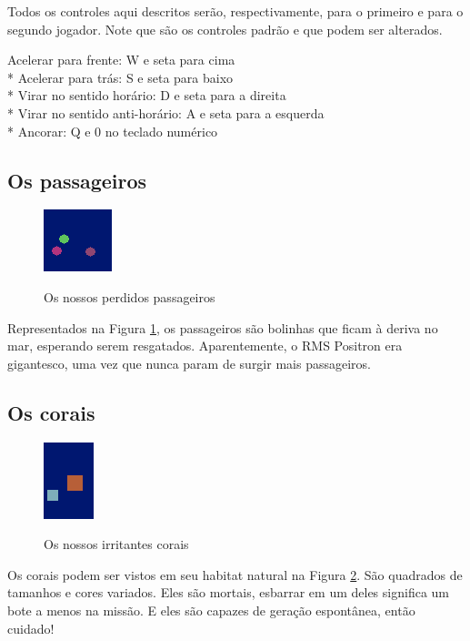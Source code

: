 \documentclass[10pt,brazil]{article}
\begin{document}
Todos os controles aqui descritos serão, respectivamente, para o primeiro e para o segundo jogador. Note que são os
controles padrão e que podem ser alterados.

Acelerar para frente: W e seta para cima\\*
Acelerar para trás: S e seta para baixo\\*
Virar no sentido horário: D e seta para a direita\\*
Virar no sentido anti-horário: A e seta para a esquerda\\*
Ancorar: Q e 0 no teclado numérico\\

\subsection{Os passageiros}

\begin{figure}
\begin{center}
\includegraphics{people}
\label{img:people}
\caption{Os nossos perdidos passageiros}
\end{center}
\end{figure}

Representados na Figura \ref{img:people}, os passageiros são bolinhas que ficam à deriva no mar, esperando serem resgatados.
Aparentemente, o RMS Positron era gigantesco, uma vez que nunca param de surgir mais passageiros.

\subsection{Os corais}

\begin{figure}
\begin{center}
\includegraphics{corals}
\label{img:corals}
\caption{Os nossos irritantes corais}
\end{center}
\end{figure}

Os corais podem ser vistos em seu habitat natural na Figura \ref{img:corals}. São quadrados de tamanhos e cores variados.
Eles são mortais, esbarrar em um deles significa um bote a menos na missão. E eles são capazes de geração espontânea,
então cuidado!
\end{document}
